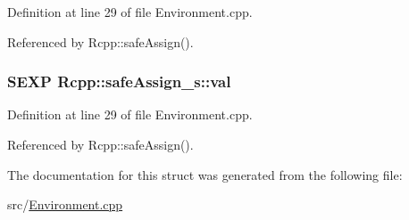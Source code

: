 Definition at line 29 of file Environment.cpp.

Referenced by Rcpp::safeAssign().\hypertarget{structRcpp_1_1safeAssign__s_a5173728e0be2b6346fe8f3cdbdc3eb25}{
\subsubsection[{val}]{\setlength{\rightskip}{0pt plus 5cm}SEXP {\bf Rcpp::safeAssign\_\-s::val}}}
\label{structRcpp_1_1safeAssign__s_a5173728e0be2b6346fe8f3cdbdc3eb25}


Definition at line 29 of file Environment.cpp.

Referenced by Rcpp::safeAssign().

The documentation for this struct was generated from the following file:\begin{DoxyCompactItemize}
\item 
src/\hyperlink{Environment_8cpp}{Environment.cpp}\end{DoxyCompactItemize}
